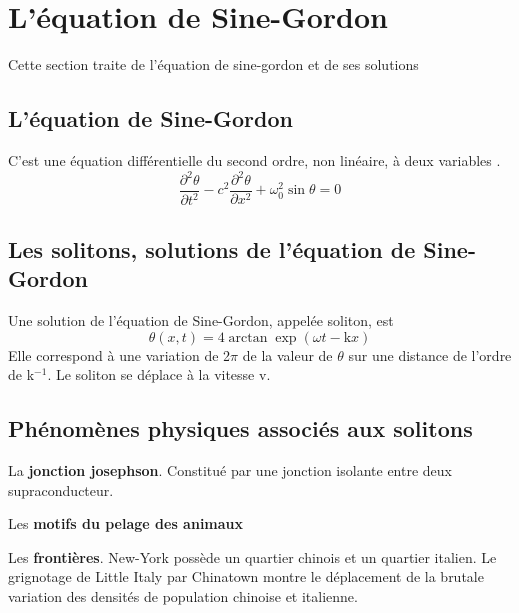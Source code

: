 %
\section{L'équation de Sine-Gordon}
%
Cette section traite de l'équation de sine-gordon et de ses solutions
\subsection{L'équation de Sine-Gordon}
\label{belmont}
C'est une équation différentielle du second ordre, non linéaire, à deux variables \cite{sine-gordon}.
\[
\frac{\partial^2\theta}{\partial t^2} - c^2 \frac{\partial^2\theta}{\partial x^2} + \omega _0 ^2 \sin \theta = 0
\]
%
%
%
\subsection{Les solitons, solutions de l'équation de Sine-Gordon}
Une solution de l'équation de Sine-Gordon, appelée soliton, est 
\[
\theta(x,t)=4\arctan \exp ( \omega t - \text{k} x )
\]
Elle correspond à une variation de 2$\pi$ de la valeur de $\theta$ sur une distance de l'ordre de k$^{-1}$. Le soliton se déplace à la vitesse v.
\subsection{Phénomènes physiques associés aux solitons}
\label{vidiani}
La {\bf jonction josephson}. Constitué par une jonction isolante entre deux supraconducteur.

Les {\bf motifs du pelage des animaux} \cite{pelage-animaux}

Les {\bf frontières}. New-York possède un quartier chinois et un quartier italien. Le grignotage de Little Italy par Chinatown montre le déplacement de la brutale variation des densités de population chinoise et italienne.

